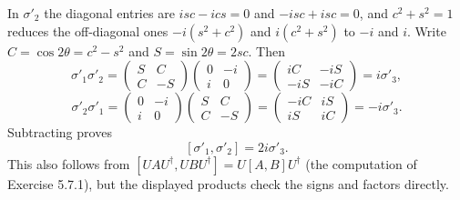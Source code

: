 In $\sigma'_2$ the diagonal entries are $isc-ics=0$ and $-isc+isc=0$,
and $c^2+s^2=1$ reduces the off-diagonal ones $-i(s^2+c^2)$ and
$i(c^2+s^2)$ to $-i$ and $i$.
Write $C=\cos2\theta=c^2-s^2$ and $S=\sin2\theta=2sc$. Then
\[
\sigma'_1\sigma'_2
=\begin{pmatrix}S&C\\C&-S\end{pmatrix}
 \begin{pmatrix}0&-i\\i&0\end{pmatrix}
=\begin{pmatrix}iC&-iS\\-iS&-iC\end{pmatrix}=i\sigma'_3,
\]
\[
\sigma'_2\sigma'_1
=\begin{pmatrix}0&-i\\i&0\end{pmatrix}
 \begin{pmatrix}S&C\\C&-S\end{pmatrix}
=\begin{pmatrix}-iC&iS\\iS&iC\end{pmatrix}=-i\sigma'_3.
\]
Subtracting proves
\[
\boxed{[\sigma'_1,\sigma'_2]=2i\sigma'_3.}
\]
This also follows from $[UAU^\dagger,UBU^\dagger]=U[A,B]U^\dagger$
(the computation of Exercise 5.7.1), but the displayed products check
the signs and factors directly.

